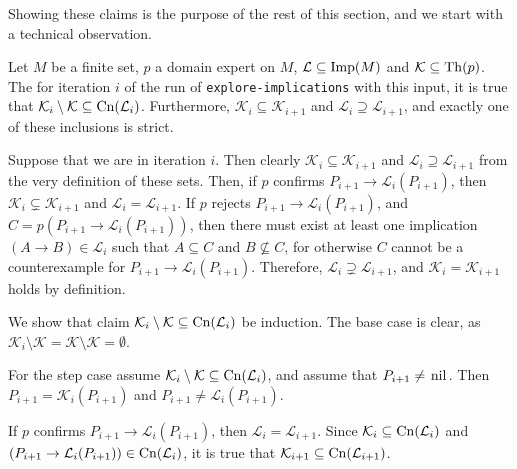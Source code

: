 Showing these claims is the purpose of the rest of this section, and we start with a
technical observation.
\begin{Proposition}
  \label{prop:technicalities-about-explore-implications}
  Let $M$ be a finite set, $p$ a domain expert on $M$, $\mathcal{L} \subseteq \operatorname{Imp}(M)$ and
  $\mathcal{K} \subseteq \operatorname{Th}(p)$.  The for iteration $i$ of the run of
  \lstinline{explore-implications} with this input, it is true that
  $\mathcal{K}_i\setminus \mathcal{K} \subseteq \operatorname{Cn}(\mathcal{L}_i)$.  Furthermore, $\mathcal{K}_i \subseteq \mathcal{K}_{i+1}$ and
  $\mathcal{L}_i \supseteq \mathcal{L}_{i+1}$, and exactly one of these inclusions is
  strict.
\end{Proposition}
\begin{Proof}
  Suppose that we are in iteration $i$.  Then clearly $\mathcal{K}_i \subseteq
  \mathcal{K}_{i+1}$ and $\mathcal{L}_i \supseteq \mathcal{L}_{i+1}$ from the very
  definition of these sets.  Then, if $p$ confirms $P_{i+1} \to \mathcal{L}_i(P_{i+1})$,
  then $\mathcal{K}_i \subsetneq \mathcal{K}_{i+1}$ and $\mathcal{L}_i =
  \mathcal{L}_{i+1}$.  If $p$ rejects $P_{i+1} \to \mathcal{L}_i(P_{i+1})$, and $C =
  p(P_{i+1} \to \mathcal{L}_i(P_{i+1}))$, then there must exist at least one implication
  $(A \to B) \in \mathcal{L}_i$ such that $A \subseteq C$ and $B \not\subseteq C$, for
  otherwise $C$ cannot be a counterexample for $P_{i+1} \to \mathcal{L}_i(P_{i+1})$.
  Therefore, $\mathcal{L}_i \supsetneq \mathcal{L}_{i+1}$, and $\mathcal{K}_i =
  \mathcal{K}_{i+1}$ holds by definition.

  We show that claim $\mathcal{K}_i \setminus \mathcal{K} \subseteq \operatorname{Cn}(\mathcal{L}_i)$ be
  induction.  The base case is clear, as $\mathcal{K}_i \setminus \mathcal{K} =
  \mathcal{K} \setminus \mathcal{K} = \emptyset$.

  For the step case assume $\mathcal{K}_i\setminus \mathcal{K} \subseteq
  \operatorname{Cn}(\mathcal{L}_i)$, and assume that $P_{i+1} \neq \text{\lstinline{nil}}$.  Then
  $P_{i+1} = \mathcal{K}_i(P_{i+1})$ and $P_{i+1} \neq \mathcal{L}_i(P_{i+1})$.

  If $p$ confirms $P_{i+1} \to \mathcal{L}_i(P_{i+1})$, then $\mathcal{L}_i =
  \mathcal{L}_{i+1}$.  Since $\mathcal{K}_i \subseteq \operatorname{Cn}(\mathcal{L}_i)$ and $(P_{i+1}
  \to \mathcal{L}_i(P_{i+1})) \in \operatorname{Cn}(\mathcal{L}_i)$, it is true that $\mathcal{K}_{i+1}
  \subseteq \operatorname{Cn}(\mathcal{L}_{i+1})$.


\end{Proof}
